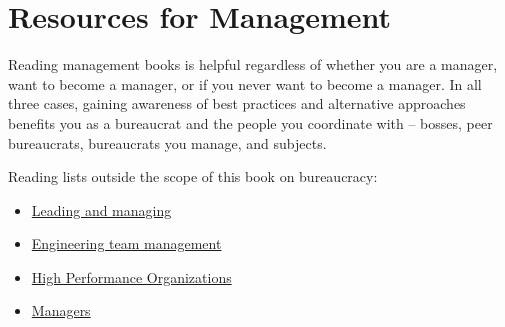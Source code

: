 \section*{Resources for Management\label{sec:resources-for-management}}

Reading management books is helpful regardless of whether you are a manager, want to become a manager, or if you never want to become a manager. In all three cases, gaining awareness of best practices and alternative approaches benefits you as a bureaucrat and the people you coordinate with -- bosses, peer bureaucrats, bureaucrats you manage, and subjects.


Reading lists outside the scope of this book on bureaucracy:
\begin{itemize}
    \item \href{https://github.com/LappleApple/awesome-leading-and-managing}{Leading and managing}
    \item \href{https://github.com/kdeldycke/awesome-engineering-team-management}{Engineering team management}
    \item \href{https://github.com/pdfernhout/High-Performance-Organizations-Reading-List}{High Performance Organizations}
    \item \href{https://github.com/ankitjaininfo/awesome-managers}{Managers}
\end{itemize}


